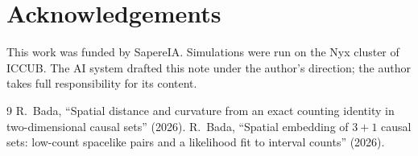\documentclass[11pt,a4paper]{article}
\begin{document}
\section*{Acknowledgements}
This work was funded by SapereIA. Simulations were run on the Nyx cluster of ICCUB. The AI system drafted this note under the author's direction; the author takes full responsibility for its content.

\begin{thebibliography}{9}\small
{} R.~Bada, ``Spatial distance and curvature from an exact counting identity in two-dimensional causal sets'' (2026).
 R.~Bada, ``Spatial embedding of $3+1$ causal sets: low-count spacelike pairs and a likelihood fit to interval counts'' (2026).
\end{thebibliography}
\end{document}
